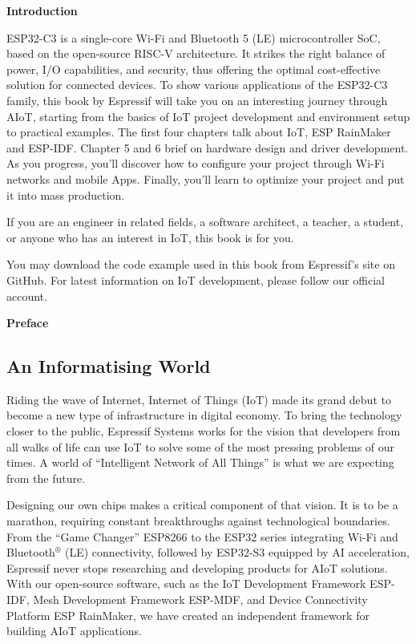 \documentclass[a4paper,12pt]{book}
\begin{document}
\maketitle


\newpage
\begin{center}
    \textcolor{Title}{\large\bfseries Introduction}
\end{center}
ESP32-C3 is a single-core Wi-Fi and Bluetooth 5 (LE) microcontroller SoC, based on the open-source RISC-V architecture. It strikes the right balance of power, I/O capabilities, and security, thus offering the optimal cost-effective solution for connected devices. To show various applications of the ESP32-C3 family, this book by Espressif will take you on an interesting journey through AIoT, starting from the basics of IoT project development and environment setup to practical examples. The first four chapters talk about IoT, ESP RainMaker and ESP-IDF. Chapter 5 and 6 brief on hardware design and driver development. As you progress, you’ll discover how to configure your project through Wi-Fi networks and mobile Apps. Finally, you’ll learn to optimize your project and put it into mass production.

If you are an engineer in related fields, a software architect, a teacher, a student, or anyone who has an interest in IoT, this book is for you.

You may download the code example used in this book from Espressif’s site on GitHub. For latest information on IoT development, please follow our official account.

\newpage
\begin{center}
    \textcolor{Title}{\LARGE\bfseries Preface}
\end{center}

\subsection*{An Informatising World}
Riding the wave of Internet, Internet of Things (IoT) made its grand debut to become a new type of infrastructure in digital economy. To bring the technology closer to the public, Espressif Systems works for the vision that developers from all walks of life can use IoT to solve some of the most pressing problems of our times. A world of “Intelligent Network of All Things” is what we are expecting from the future.

Designing our own chips makes a critical component of that vision. It is to be a marathon, requiring constant breakthroughs against technological boundaries. From the “Game Changer” ESP8266 to the ESP32 series integrating Wi-Fi and Bluetooth$^\circledR$ (LE) connectivity, followed by ESP32-S3 equipped by AI acceleration, Espressif never stops researching and developing products for AIoT solutions. With our open-source software, such as the IoT Development Framework ESP-IDF, Mesh Development Framework ESP-MDF, and Device Connectivity Platform ESP RainMaker, we have created an independent framework for building AIoT applications.
\end{document}
